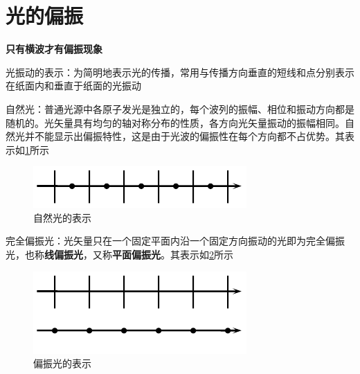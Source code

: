 \documentclass[12pt, a4paper, twoside]{ctexbook}
\begin{document}
\section{光的偏振}
\textbf{只有横波才有偏振现象}

{\sonti 光振动的表示}：为简明地表示光的传播，常用与传播方向垂直的短线和点分别表示在纸面内和垂直于纸面的光振动

{\sonti 自然光}：普通光源中各原子发光是独立的，每个波列的振幅、相位和振动方向都是随机的。光矢量具有均匀的轴对称分布的性质，各方向光矢量振动的振幅相同。自然光并不能显示出偏振特性，这是由于光波的偏振性在每个方向都不占优势。其表示如\textcolor{blue}{\cref{fig:自然光}}所示
\begin{figure}[H]
    \centerline{\includegraphics[scale=1.2]{自然光}}
    \caption{自然光的表示}
    \label{fig:自然光}
\end{figure}

{\sonti 完全偏振光}：光矢量只在一个固定平面内沿一个固定方向振动的光即为完全偏振光，也称\textbf{线偏振光}，又称\textbf{平面偏振光}。其表示如\textcolor{blue}{\cref{fig:偏振光}}所示
\begin{figure}[H]
    \centerline{\includegraphics[scale=1.2]{偏振光}}
    \caption{偏振光的表示}
    \label{fig:偏振光}
\end{figure}
\end{document}
